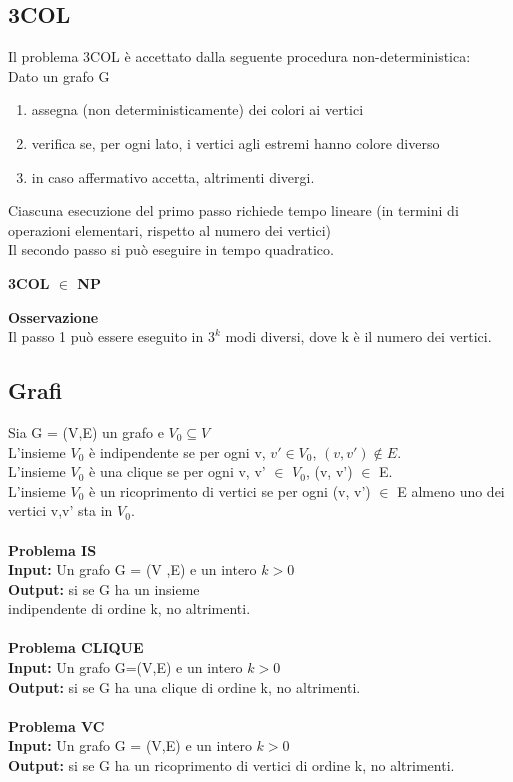 \subsection{3COL}
Il problema 3COL è accettato dalla seguente procedura non-deterministica:\\
Dato un grafo G
\begin{enumerate}
    \item  assegna (non deterministicamente) dei colori ai vertici
    
    \item  verifica se, per ogni lato, i vertici agli estremi hanno colore diverso
    
    \item in caso affermativo accetta, altrimenti divergi.
\end{enumerate}
Ciascuna esecuzione del primo passo richiede tempo lineare (in termini di operazioni elementari, rispetto al numero dei vertici)\\
Il secondo passo si può eseguire in tempo quadratico.
\begin{center}
    \textbf{3COL $\in$ NP}
\end{center}
\textbf{Osservazione}\\
Il passo 1 può essere eseguito in $3^k$ modi diversi, dove k è il numero dei vertici.
\subsection{Grafi}
Sia G = (V,E) un grafo e $V_0 \subseteq V$\\
L'insieme $V_0$ è indipendente se per ogni v, $v' \in V_0$, $(v, v') \notin E$.\\
L'insieme $V_0$ è una clique se per ogni v, v' $\in$ $V_0$, (v, v') $\in$ E.\\
L’insieme $V_0$ è un ricoprimento di vertici se per ogni (v, v') $\in$ E almeno uno dei vertici v,v' sta in $V_0$.\\\\
\textbf{Problema IS}\\
\textbf{Input:} Un grafo G = (V ,E) e un intero $k > 0$\\
\textbf{Output:} si se G ha un insieme\\ indipendente di ordine k, no altrimenti.\\\\
\textbf{Problema CLIQUE}\\
\textbf{Input:} Un grafo G=(V,E) e un intero $k > 0$\\
\textbf{Output:} si se G ha una clique di ordine k, no altrimenti.\\\\
\textbf{Problema VC}\\
\textbf{Input:} Un grafo G = (V,E) e un intero $k > 0$\\
\textbf{Output:} si se G ha un ricoprimento di vertici di ordine k, no altrimenti.
